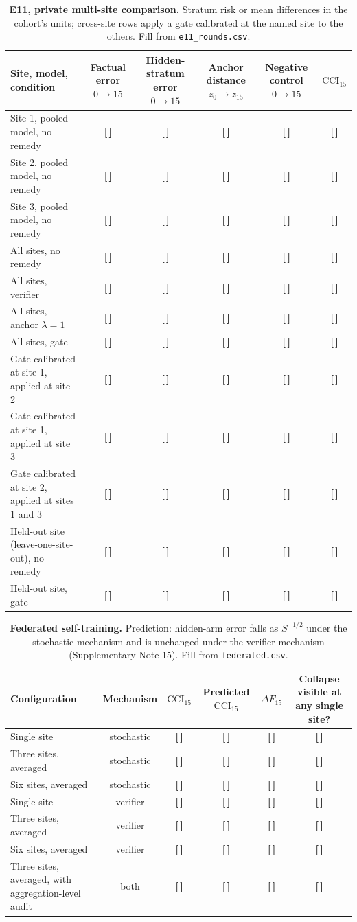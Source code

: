 \documentclass[11pt,a4paper]{article}
\newcommand{\T}{{\color{red}\textbf{[\,]}}}
\newcommand{\CCI}{\mathrm{CCI}}
\begin{document}
\begin{table}[!htbp]\centering\footnotesize
\caption{\textbf{E11, private multi-site comparison.} Stratum risk or mean differences in the cohort's units; cross-site rows apply a gate calibrated at the named site to the others. Fill from \texttt{e11\_rounds.csv}.}
\label{tab:s35}
\begin{tabularx}{\textwidth}{@{}p{3.9cm} C C C C C@{}}\toprule
Site, model, condition & Factual error $0\to15$ & Hidden-stratum error $0\to15$ & Anchor distance $z_0\to z_{15}$ & Negative control $0\to15$ & $\CCI_{15}$\\\midrule
Site 1, pooled model, no remedy & \T & \T & \T & \T & \T\\
Site 2, pooled model, no remedy & \T & \T & \T & \T & \T\\
Site 3, pooled model, no remedy & \T & \T & \T & \T & \T\\
\midrule
All sites, no remedy & \T & \T & \T & \T & \T\\
All sites, verifier & \T & \T & \T & \T & \T\\
All sites, anchor $\lambda=1$ & \T & \T & \T & \T & \T\\
All sites, gate & \T & \T & \T & \T & \T\\
\midrule
Gate calibrated at site 1, applied at site 2 & \T & \T & \T & \T & \T\\
Gate calibrated at site 1, applied at site 3 & \T & \T & \T & \T & \T\\
Gate calibrated at site 2, applied at sites 1 and 3 & \T & \T & \T & \T & \T\\
\midrule
Held-out site (leave-one-site-out), no remedy & \T & \T & \T & \T & \T\\
Held-out site, gate & \T & \T & \T & \T & \T\\
\bottomrule\end{tabularx}
\end{table}
\FloatBarrier
\begin{table}[!htbp]\centering\footnotesize
\caption{\textbf{Federated self-training.} Prediction: hidden-arm error falls as $S^{-1/2}$ under the stochastic mechanism and is unchanged under the verifier mechanism (Supplementary Note 15). Fill from \texttt{federated.csv}.}
\label{tab:s36}
\begin{tabularx}{\textwidth}{@{}p{3.9cm} C C C C C@{}}\toprule
Configuration & Mechanism & $\CCI_{15}$ & Predicted $\CCI_{15}$ & $\Delta F_{15}$ & Collapse visible at any single site?\\\midrule
Single site & stochastic & \T & \T & \T & \T\\
Three sites, averaged & stochastic & \T & \T & \T & \T\\
Six sites, averaged & stochastic & \T & \T & \T & \T\\
\midrule
Single site & verifier & \T & \T & \T & \T\\
Three sites, averaged & verifier & \T & \T & \T & \T\\
Six sites, averaged & verifier & \T & \T & \T & \T\\
\midrule
Three sites, averaged, with aggregation-level audit & both & \T & \T & \T & \T\\
\bottomrule\end{tabularx}
\end{table}
\end{document}
